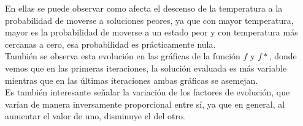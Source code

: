 \documentclass[a4paper,12pt]{article}
\begin{document}
	En ellas se puede observar como afecta el descenso de la temperatura a la probabilidad de moverse a soluciones peores, ya que con mayor temperatura, mayor es la probabilidad de moverse a un estado peor y con temperatura más cercanas a cero, esa probabilidad es prácticamente nula.\\
	
	También se observa esta evolución en las gráficas de la función $f$ y $f*$, donde vemos que en las primeras iteraciones, la solución evaluada es más variable mientras que en las últimas iteraciones ambas gráficas se asemejan.\\
	
	Es también interesante señalar la variación de los factores de evolución, que varían de manera inversamente proporcional entre sí, ya que en general, al aumentar el valor de uno, disminuye el del otro.
	
\end{document}
